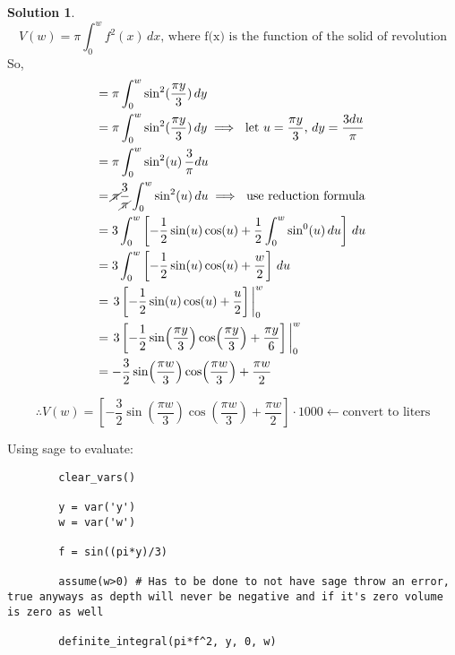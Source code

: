 \documentclass[10pt]{article}
\theoremstyle{definition}
\newtheorem{soln}{Solution}
\begin{document}
\begin{soln}
    \begin{equation}
        V(w) = \pi\int_{0}^{w} f^2(x) \,dx \text{, where f(x) is the function of the solid of revolution}
    \end{equation}
    So,
    \begin{align*}
         & = \pi\int_{0}^{w} \sin^2(\frac{\pi y}{3}) \,dy                                                                        \\
         & = \pi\int_{0}^{w} \sin^2(\frac{\pi y}{3}) \,dy \implies \text{ let } u=\frac{\pi y}{3} \text{, } dy = \frac{3du}{\pi} \\
         & = \pi\int_{0}^{w} \sin^2(u) \,\frac{3}{\pi}du                                                                         \\
         & = \cancel{\pi}\frac{3}{\cancel{\pi}}\int_{0}^{w} \sin^2(u) \,du \implies \text{ use reduction formula }               \\
         & = 3\int_{0}^{w} \left[-\frac{1}{2}\sin(u)\cos(u)+\frac{1}{2} \int_{0}^{w} \sin^0(u) \,du \right]\,du                  \\
         & = 3\int_{0}^{w} \left[-\frac{1}{2}\sin(u)\cos(u)+\frac{w}{2} \right]\,du                                              \\
         & = \eval{3\left[-\frac{1}{2}\sin(u)\cos(u)+\frac{u}{2} \right]}_0^w                                                    \\
         & = \eval{3\left[-\frac{1}{2}\sin(\frac{\pi y}{3})\cos(\frac{\pi y}{3})+\frac{\pi y}{6} \right]}_0^w                    \\
         & = -\frac{3}{2}\sin(\frac{\pi w}{3})\cos(\frac{\pi w}{3})+\frac{\pi w}{2}                                              \\
    \end{align*}

    $$\therefore V(w) = \left[-\frac{3}{2}\sin(\frac{\pi w}{3})\cos(\frac{\pi w}{3})+\frac{\pi w}{2}\right]\cdot 1000 \leftarrow \text{convert to liters} $$

    \noindent Using sage to evaluate:

    \begin{verbatim}
        clear_vars()

        y = var('y')
        w = var('w')
        
        f = sin((pi*y)/3)
        
        assume(w>0) # Has to be done to not have sage throw an error, true anyways as depth will never be negative and if it's zero volume is zero as well
        
        definite_integral(pi*f^2, y, 0, w)
    \end{verbatim}
\end{soln}
\end{document}
